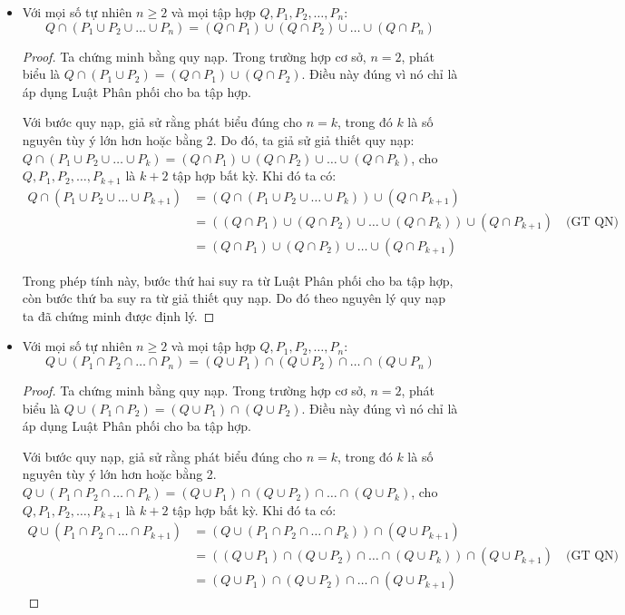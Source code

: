 \documentclass[12pt,a4paper]{article}
\theoremstyle{definition}
\begin{document}
\begin{itemize}
\item Với mọi số tự nhiên $n \ge 2$ và mọi tập hợp $Q, P_1, P_2, \ldots, P_n$:
\[Q \cap (P_1 \cup P_2 \cup \ldots \cup P_n) = (Q \cap P_1) \cup (Q \cap P_2) \cup \ldots \cup (Q \cap P_n)\]

\begin{proof}
Ta chứng minh bằng quy nạp. Trong trường hợp cơ sở, $n = 2$, phát biểu là $Q \cap (P_1 \cup P_2) = (Q \cap P_1) \cup (Q \cap P_2)$. Điều này đúng vì nó chỉ là áp dụng Luật Phân phối cho ba tập hợp.

Với bước quy nạp, giả sử rằng phát biểu đúng cho $n = k$, trong đó $k$ là số nguyên tùy ý lớn hơn hoặc bằng 2. Do đó, ta giả sử giả thiết quy nạp: $Q \cap (P_1 \cup P_2 \cup \ldots \cup P_k) = (Q \cap P_1) \cup (Q \cap P_2) \cup \ldots \cup (Q \cap P_k)$, cho $Q, P_1, P_2, \ldots, P_{k+1}$ là $k + 2$ tập hợp bất kỳ. Khi đó ta có:
\begin{align*}
Q \cap (P_1 \cup P_2 \cup \ldots \cup P_{k+1}) &= (Q \cap (P_1 \cup P_2 \cup \ldots \cup P_k)) \cup (Q \cap P_{k+1}) \\
&= ((Q \cap P_1) \cup (Q \cap P_2) \cup \ldots \cup (Q \cap P_k)) \cup (Q \cap P_{k+1}) \quad \text{(GT QN)}\\
&= (Q \cap P_1) \cup (Q \cap P_2) \cup \ldots \cup (Q \cap P_{k+1})
\end{align*}

Trong phép tính này, bước thứ hai suy ra từ Luật Phân phối cho ba tập hợp, còn bước thứ ba suy ra từ giả thiết quy nạp. Do đó theo nguyên lý quy nạp ta đã chứng minh được định lý.
\end{proof}

\item Với mọi số tự nhiên $n \ge 2$ và mọi tập hợp $Q, P_1, P_2, \ldots, P_n$:
\[Q \cup (P_1 \cap P_2 \cap \ldots \cap P_n) = (Q \cup P_1) \cap (Q \cup P_2) \cap \ldots \cap (Q \cup P_n)\]

\begin{proof}
Ta chứng minh bằng quy nạp. Trong trường hợp cơ sở, $n = 2$, phát biểu là $Q \cup (P_1 \cap P_2) = (Q \cup P_1) \cap (Q \cup P_2)$. Điều này đúng vì nó chỉ là áp dụng Luật Phân phối cho ba tập hợp.

Với bước quy nạp, giả sử rằng phát biểu đúng cho $n = k$, trong đó $k$ là số nguyên tùy ý lớn hơn hoặc bằng 2. $Q \cup (P_1 \cap P_2 \cap \ldots \cap P_k) = (Q \cup P_1) \cap (Q \cup P_2) \cap \ldots \cap (Q \cup P_k)$, cho $Q, P_1, P_2, \ldots, P_{k+1}$ là $k + 2$ tập hợp bất kỳ. Khi đó ta có:
\begin{align*}
Q \cup (P_1 \cap P_2 \cap \ldots \cap P_{k+1}) &= (Q \cup (P_1 \cap P_2 \cap \ldots \cap P_k)) \cap (Q \cup P_{k+1}) \\
&= ((Q \cup P_1) \cap (Q \cup P_2) \cap \ldots \cap (Q \cup P_k)) \cap (Q \cup P_{k+1}) \quad \text{(GT QN)}\\
&= (Q \cup P_1) \cap (Q \cup P_2) \cap \ldots \cap (Q \cup P_{k+1})
\end{align*}


\end{proof}
\end{itemize}
\end{document}
